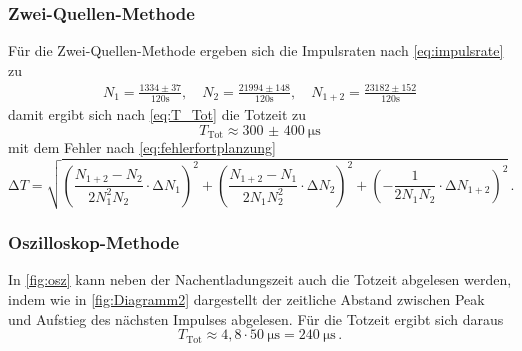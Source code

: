 \subsubsection*{Zwei-Quellen-Methode}

Für die Zwei-Quellen-Methode ergeben sich die Impulsraten nach \autoref{eq:impulsrate} zu
\begin{align*}
    N_{1}   =\frac{1334 \pm 37}{120 \mathrm{s}}, \quad 
    N_{2}   =\frac{21994 \pm 148}{120 \mathrm{s}}, \quad 
    N_{1+2} =\frac{23182 \pm 152}{120 \mathrm{s}}
\end{align*}
damit ergibt sich nach \autoref{eq:T_Tot} die Totzeit zu
\begin{equation}
    T_\text{Tot} \approx \qty{300(400)}{\micro\second}
\end{equation}
mit dem Fehler nach \autoref{eq:fehlerfortplanzung}
\begin{equation*}
    \increment T  = \sqrt{
      \left(\frac{N_{1+2}-N_{2}}{2 N_{1}^{2} N_{2}} \cdot \increment N_{1}\right)^{2} 
    + \left(\frac{N_{1+2}-N_{1}}{2 N_{1} N_{2}^{2}} \cdot \increment N_{2}\right)^{2} 
    + \left(-\frac{1}{2 N_{1} N_{2}} \cdot \increment N_{1+2}\right)^{2}
    } \, .
\end{equation*}

\subsubsection*{Oszilloskop-Methode}

In \autoref{fig:osz} kann neben der Nachentladungszeit auch die Totzeit abgelesen werden, 
indem wie in \autoref{fig:Diagramm2} dargestellt der zeitliche Abstand zwischen Peak und Aufstieg
des nächsten Impulses abgelesen. Für die Totzeit ergibt sich daraus
\begin{equation*}
    T_\text{Tot} \approx 4,8 \cdot \qty{50}{\micro\second} = \qty{240}{\micro\second} \, .
\end{equation*}
